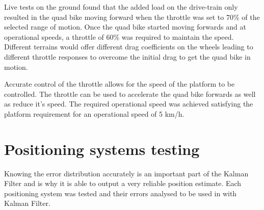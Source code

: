 \documentclass[main.tex]{subfiles}
\begin{document}
Live tests on the ground found that the added load on the drive-train only resulted in the quad bike moving forward when the throttle was set to 70\% of the selected range of motion. Once the quad bike started moving forwards and at operational speeds, a throttle of 60\% was required to maintain the speed. Different terrains would offer different drag coefficients on the wheels leading to different throttle responses to overcome the initial drag to get the quad bike in motion.

Accurate control of the throttle allows for the speed of the platform to be controlled. The throttle can be used to accelerate the quad bike forwards as well as reduce it's speed. The required operational speed was achieved satisfying the platform requirement for an operational speed of 5 km/h. 
\section{Positioning systems testing}
Knowing the error distribution accurately is an important part of the Kalman Filter and is why it is able to output a very reliable position estimate. Each positioning system was tested and their errors analysed to be used in with Kalman Filter.
\end{document}
